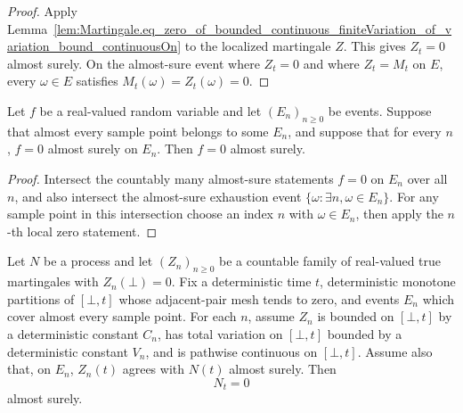 \begin{proof}
Apply
Lemma~\ref{lem:Martingale.eq_zero_of_bounded_continuous_finiteVariation_of_variation_bound_continuousOn}
to the localized martingale \(Z\).  This gives \(Z_t=0\) almost surely.  On
the almost-sure event where \(Z_t=0\) and where \(Z_t=M_t\) on \(E\), every
\(\omega\in E\) satisfies \(M_t(\omega)=Z_t(\omega)=0\).
\end{proof}

\begin{lemma}\label{lem:MeasureTheory.ae_eq_zero_of_eventually_event_zero_exhaustion}
Let \(f\) be a real-valued random variable and let \((E_n)_{n\ge 0}\) be
events.  Suppose that almost every sample point belongs to some \(E_n\), and
suppose that for every \(n\), \(f=0\) almost surely on \(E_n\).  Then
\(f=0\) almost surely.
\end{lemma}

\begin{proof}
Intersect the countably many almost-sure statements \(f=0\) on \(E_n\) over
all \(n\), and also intersect the almost-sure exhaustion event
\(\{\omega:\exists n,\omega\in E_n\}\).  For any sample point in this
intersection choose an index \(n\) with \(\omega\in E_n\), then apply the
\(n\)-th local zero statement.
\end{proof}

\begin{lemma}\label{lem:Martingale.eq_zero_of_localized_bounded_continuous_finiteVariation_of_variation_bound_continuousOn}
Let \(N\) be a process and let \((Z_n)_{n\ge 0}\) be a countable family of
real-valued true martingales with \(Z_n(\bot)=0\).  Fix a deterministic time
\(t\), deterministic monotone partitions of \([\bot,t]\) whose adjacent-pair
mesh tends to zero, and events \(E_n\) which cover almost every sample point.
For each \(n\), assume \(Z_n\) is bounded on \([\bot,t]\) by a deterministic
constant \(C_n\), has total variation on \([\bot,t]\) bounded by a deterministic
constant \(V_n\), and is pathwise continuous on \([\bot,t]\).  Assume also that,
on \(E_n\), \(Z_n(t)\) agrees with \(N(t)\) almost surely.  Then
\[
  N_t=0
\]
almost surely.
\end{lemma}

